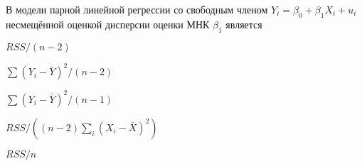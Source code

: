 
\begin{question}
В модели парной линейной регрессии со свободным членом
\(Y_i = \beta_0 + \beta_1 X_i + u_i\)
несмещённой оценкой дисперсии оценки МНК \(\hat\beta_1\) является
\begin{answerlist}
  \item \(RSS/(n-2)\)
  \item \(\sum (Y_i - \bar Y)^2 / (n-2)\)
  \item \(\sum (Y_i - \bar Y)^2 / (n-1)\)
  \item \(RSS/((n-2)\sum_i (X_i - \bar X)^2)\)
  \item \(RSS/n\)
\end{answerlist}
\end{question}


